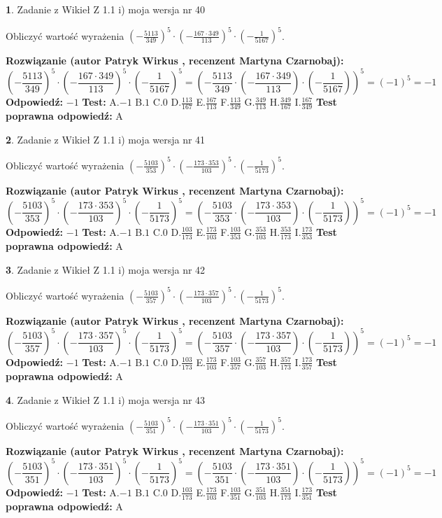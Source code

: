 \documentclass[12pt, a4paper]{article}
\theoremstyle{definition} %
\newtheorem{zad}{}
\newcommand{\zadStart}[1]{\begin{zad}#1\newline}
\newcommand{\zadStop}{\end{zad}}
\newcommand{\rozwStart}[2]{\noindent \textbf{Rozwiązanie (autor #1 , recenzent #2): }\newline}
\newcommand{\rozwStop}{\newline}
\newcommand{\odpStart}{\noindent \textbf{Odpowiedź:}\newline}
\newcommand{\odpStop}{\newline}
\newcommand{\testStart}{\noindent \textbf{Test:}\newline}
\newcommand{\testStop}{\newline}
\newcommand{\kluczStart}{\noindent \textbf{Test poprawna odpowiedź:}\newline}
\newcommand{\kluczStop}{\newline}
\begin{document}
\zadStart{Zadanie z Wikieł Z 1.1 i) moja wersja nr 40}

Obliczyć wartość wyrażenia $(-\frac{5113}{349})^{5} \cdot (-\frac{167 \cdot 349}{113})^{5} \cdot (-\frac{1}{5167})^{5}$.
\zadStop
\rozwStart{Patryk Wirkus}{Martyna Czarnobaj}
$$(-\frac{5113}{349})^{5} \cdot (-\frac{167 \cdot 349}{113})^{5} \cdot (-\frac{1}{5167})^{5} = (-\frac{5113}{349} \cdot (-\frac{167 \cdot 349}{113}) \cdot (-\frac{1}{5167}))^{5} = (-1)^{5} = -1$$
\rozwStop
\odpStart
$-1$
\odpStop
\testStart
A.$-1$ B.$1$ C.$0$ D.$\frac{113}{167}$ E.$\frac{167}{113}$
F.$\frac{113}{349}$ G.$\frac{349}{113}$
H.$\frac{349}{167}$
I.$\frac{167}{349}$
\testStop
\kluczStart
A
\kluczStop



\zadStart{Zadanie z Wikieł Z 1.1 i) moja wersja nr 41}

Obliczyć wartość wyrażenia $(-\frac{5103}{353})^{5} \cdot (-\frac{173 \cdot 353}{103})^{5} \cdot (-\frac{1}{5173})^{5}$.
\zadStop
\rozwStart{Patryk Wirkus}{Martyna Czarnobaj}
$$(-\frac{5103}{353})^{5} \cdot (-\frac{173 \cdot 353}{103})^{5} \cdot (-\frac{1}{5173})^{5} = (-\frac{5103}{353} \cdot (-\frac{173 \cdot 353}{103}) \cdot (-\frac{1}{5173}))^{5} = (-1)^{5} = -1$$
\rozwStop
\odpStart
$-1$
\odpStop
\testStart
A.$-1$ B.$1$ C.$0$ D.$\frac{103}{173}$ E.$\frac{173}{103}$
F.$\frac{103}{353}$ G.$\frac{353}{103}$
H.$\frac{353}{173}$
I.$\frac{173}{353}$
\testStop
\kluczStart
A
\kluczStop



\zadStart{Zadanie z Wikieł Z 1.1 i) moja wersja nr 42}

Obliczyć wartość wyrażenia $(-\frac{5103}{357})^{5} \cdot (-\frac{173 \cdot 357}{103})^{5} \cdot (-\frac{1}{5173})^{5}$.
\zadStop
\rozwStart{Patryk Wirkus}{Martyna Czarnobaj}
$$(-\frac{5103}{357})^{5} \cdot (-\frac{173 \cdot 357}{103})^{5} \cdot (-\frac{1}{5173})^{5} = (-\frac{5103}{357} \cdot (-\frac{173 \cdot 357}{103}) \cdot (-\frac{1}{5173}))^{5} = (-1)^{5} = -1$$
\rozwStop
\odpStart
$-1$
\odpStop
\testStart
A.$-1$ B.$1$ C.$0$ D.$\frac{103}{173}$ E.$\frac{173}{103}$
F.$\frac{103}{357}$ G.$\frac{357}{103}$
H.$\frac{357}{173}$
I.$\frac{173}{357}$
\testStop
\kluczStart
A
\kluczStop



\zadStart{Zadanie z Wikieł Z 1.1 i) moja wersja nr 43}

Obliczyć wartość wyrażenia $(-\frac{5103}{351})^{5} \cdot (-\frac{173 \cdot 351}{103})^{5} \cdot (-\frac{1}{5173})^{5}$.
\zadStop
\rozwStart{Patryk Wirkus}{Martyna Czarnobaj}
$$(-\frac{5103}{351})^{5} \cdot (-\frac{173 \cdot 351}{103})^{5} \cdot (-\frac{1}{5173})^{5} = (-\frac{5103}{351} \cdot (-\frac{173 \cdot 351}{103}) \cdot (-\frac{1}{5173}))^{5} = (-1)^{5} = -1$$
\rozwStop
\odpStart
$-1$
\odpStop
\testStart
A.$-1$ B.$1$ C.$0$ D.$\frac{103}{173}$ E.$\frac{173}{103}$
F.$\frac{103}{351}$ G.$\frac{351}{103}$
H.$\frac{351}{173}$
I.$\frac{173}{351}$
\testStop
\kluczStart
A
\kluczStop
\end{document}
